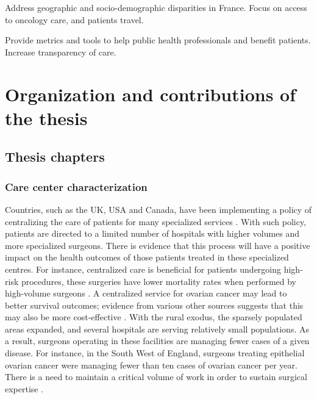 
Address geographic and socio-demographic disparities in France.
Focus on access to oncology care, and patients travel.

Provide metrics and tools to help public health professionals and benefit
patients.
Increase transparency of care.

\section{Organization and contributions of the thesis}

\subsection{Thesis chapters}

\subsubsection{Care center characterization}

Countries, such as the UK, USA and Canada, have been implementing a policy of
centralizing the care of patients for many specialized services
\cite{kelly_are_2016}. With such policy, patients are directed to a limited
number of hospitals with higher volumes and more specialized surgeons. There is
evidence that this process will have a positive impact on the health outcomes of
those patients treated in these specialized centres. For instance, centralized
care is beneficial for patients undergoing high-risk procedures, these surgeries
have lower mortality rates when performed by high-volume surgeons
\cite{pekala_centralization_2021,birkmeyer_surgeon_2003,finks_trends_2011,
    hollenbeck_getting_2007,goossens-laan_systematic_2011}. A centralized service
for ovarian cancer may lead to better survival outcomes; evidence from various
other sources suggests that this may also be more cost-effective
\cite{woo_centralisation_2012}. With the rural exodus, the sparsely populated
areas expanded, and several hospitals are serving relatively small populations.
As a result, surgeons operating in these facilities are managing fewer cases of
a given disease. For instance, in the South West of England, surgeons treating
epithelial ovarian cancer were managing fewer than ten cases of ovarian cancer
per year. There is a need to maintain a critical volume of work in order to
sustain surgical expertise \cite{olaitan_surgical_2001}.

